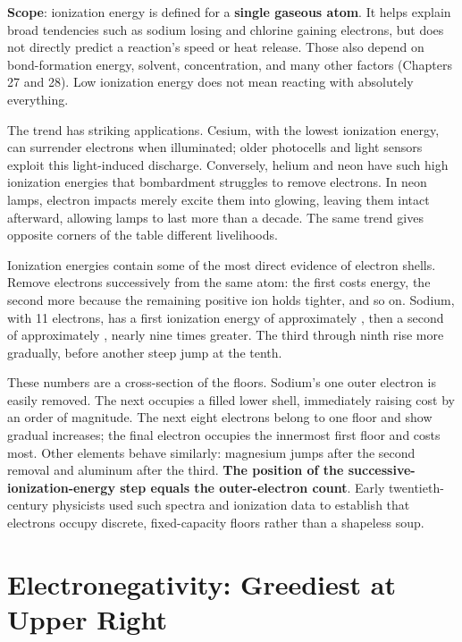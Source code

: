 \textbf{Scope}: ionization energy is defined for a \textbf{single gaseous atom}. It helps explain broad tendencies such as sodium losing and chlorine gaining electrons, but does not directly predict a reaction's speed or heat release. Those also depend on bond-formation energy, solvent, concentration, and many other factors (Chapters 27 and 28). Low ionization energy does not mean reacting with absolutely everything.

The trend has striking applications. Cesium, with the lowest ionization energy, can surrender electrons when illuminated; older photocells and light sensors exploit this light-induced discharge. Conversely, helium and neon have such high ionization energies that bombardment struggles to remove electrons. In neon lamps, electron impacts merely excite them into glowing, leaving them intact afterward, allowing lamps to last more than a decade. The same trend gives opposite corners of the table different livelihoods.

\begin{zhengju}
Ionization energies contain some of the most direct evidence of electron shells. Remove electrons successively from the same atom: the first costs energy, the second more because the remaining positive ion holds tighter, and so on. Sodium, with 11 electrons, has a first ionization energy of approximately , then a second of approximately , nearly nine times greater. The third through ninth rise more gradually, before another steep jump at the tenth.

These numbers are a cross-section of the floors. Sodium's one outer electron is easily removed. The next occupies a filled lower shell, immediately raising cost by an order of magnitude. The next eight electrons belong to one floor and show gradual increases; the final electron occupies the innermost first floor and costs most. Other elements behave similarly: magnesium jumps after the second removal and aluminum after the third. \textbf{The position of the successive-ionization-energy step equals the outer-electron count}. Early twentieth-century physicists used such spectra and ionization data to establish that electrons occupy discrete, fixed-capacity floors rather than a shapeless soup.
\end{zhengju}

\section{Electronegativity: Greediest at Upper Right}

